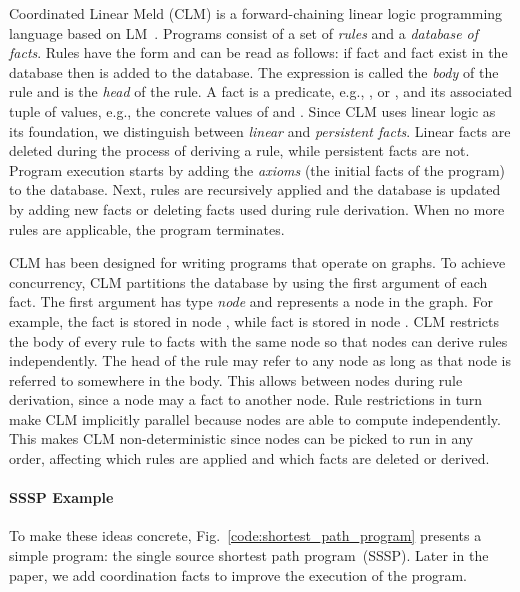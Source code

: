 Coordinated Linear Meld (CLM) is a forward-chaining linear logic programming
language based on LM~\cite{cruz-iclp14}.
Programs consist of a set of \emph{rules} and a \emph{database of facts}.
Rules have the form  and can be read as follows: if fact 
and fact  exist in the database then  is added to
the database. The expression  is called the \emph{body} of
the rule and  is the \emph{head} of the rule.
A fact is a predicate, e.g., ,  or , and its
associated tuple of values, e.g., the concrete values of  and
. Since CLM uses linear logic as its foundation, we distinguish between
\emph{linear} and \emph{persistent facts}. Linear facts are deleted during the
process of deriving a rule, while persistent facts are not.
Program execution starts by adding the \emph{axioms} (the initial facts of the
program) to the database. Next, rules are recursively applied and the
database is updated by adding new facts or deleting facts used during rule derivation.
When no more rules are applicable, the program terminates.

CLM has been designed for writing programs that operate on graphs. To achieve
concurrency, CLM partitions the database by using the first argument of each fact. The first argument has
type \emph{node} and represents a node in the graph. For example,
the fact  is stored in node , while
fact  is stored in node . CLM restricts the body of
every rule to facts with the same node so that nodes can derive rules
independently. The head of the rule may refer
to any node as long as that node is referred to somewhere in the body. This allows
 between nodes during rule derivation, since a node may
 a fact to another node.  Rule restrictions in turn make CLM
implicitly parallel because nodes are able to compute independently. This makes
CLM non-deterministic since nodes can be picked to run in any order, affecting
which rules are applied and which facts are deleted or derived.

\paragraph{SSSP Example}\label{sect:ssspex}
To make these ideas concrete, Fig.~\ref{code:shortest_path_program} presents
a simple program: the single source shortest path program~(SSSP). Later in the paper, we
add coordination facts to improve the execution of the program.

